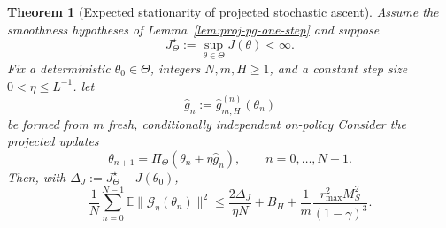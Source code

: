 \documentclass{article}
\newtheorem{thm}{Theorem}[section]
\theoremstyle{definition}
\theoremstyle{remark}
\theoremstyle{mystyle}
\newcommand{\1}{\mathbbm{1}}
\begin{document}
\begin{thm}[Expected stationarity of projected stochastic ascent]
\label{thm:proj-pg-stationarity}
Assume the smoothness hypotheses of Lemma~\ref{lem:proj-pg-one-step}
and suppose
\[
J_\Theta^\star:=\sup_{\theta\in\Theta}J(\theta)<\infty.
\]
Fix a deterministic $\theta_0\in\Theta$, integers $N,m,H\ge1$,
and a constant step size $0<\eta\le L^{-1}$.
let
\[
\widehat g_n:=\widehat g_{m,H}^{(n)}(\theta_n)
\]
be formed from $m$ fresh, conditionally independent on-policy
Consider the projected updates
\begin{equation}
\theta_{n+1}=\Pi_\Theta(\theta_n+\eta\widehat g_n),
\qquad n=0,\ldots,N-1.
\label{eq:proj-pg-update}
\end{equation}
Then, with $\Delta_J:=J_\Theta^\star-J(\theta_0)$,
\begin{equation}
\frac1N\sum_{n=0}^{N-1}
\mathbb E\|\mathcal G_\eta(\theta_n)\|^2
\le \frac{2\Delta_J}{\eta N}+B_H+\frac{1}{m}\frac{r_{\max}^2M_S^2}
{(1-\gamma)^3}.
\label{eq:proj-pg-stationarity-bound}
\end{equation}
\end{thm}
\end{document}
